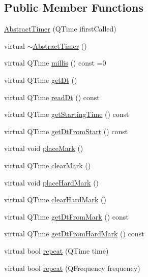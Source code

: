 \subsection*{Public Member Functions}
\begin{DoxyCompactItemize}
\item 
\mbox{\hyperlink{classokapi_1_1AbstractTimer_aec03f7e11e25f300ec1fd44aaff3596f}{Abstract\+Timer}} (Q\+Time ifirst\+Called)
\item 
virtual \mbox{\hyperlink{classokapi_1_1AbstractTimer_a720f854545bab2158135149174758736}{$\sim$\+Abstract\+Timer}} ()
\item 
virtual Q\+Time \mbox{\hyperlink{classokapi_1_1AbstractTimer_a6871e119f74d8b6a8c928244e837e762}{millis}} () const =0
\item 
virtual Q\+Time \mbox{\hyperlink{classokapi_1_1AbstractTimer_a6c79c35780dbc4e04e356167bb175424}{get\+Dt}} ()
\item 
virtual Q\+Time \mbox{\hyperlink{classokapi_1_1AbstractTimer_a4208d7ef0b828422ba02dfd563306ab1}{read\+Dt}} () const
\item 
virtual Q\+Time \mbox{\hyperlink{classokapi_1_1AbstractTimer_a4707dcc563e750ee491918d7c5755bc3}{get\+Starting\+Time}} () const
\item 
virtual Q\+Time \mbox{\hyperlink{classokapi_1_1AbstractTimer_ac681cdd9a5147df0b796e9af836502c8}{get\+Dt\+From\+Start}} () const
\item 
virtual void \mbox{\hyperlink{classokapi_1_1AbstractTimer_a34c9be79510d23d702fd22188d542ec9}{place\+Mark}} ()
\item 
virtual Q\+Time \mbox{\hyperlink{classokapi_1_1AbstractTimer_a78d62559bbd51a71372f37920af78261}{clear\+Mark}} ()
\item 
virtual void \mbox{\hyperlink{classokapi_1_1AbstractTimer_a177197191296d0d7a5c49c86d5a514fc}{place\+Hard\+Mark}} ()
\item 
virtual Q\+Time \mbox{\hyperlink{classokapi_1_1AbstractTimer_af462e941170d1659dd04ab9d1ead3968}{clear\+Hard\+Mark}} ()
\item 
virtual Q\+Time \mbox{\hyperlink{classokapi_1_1AbstractTimer_a11b84685aac3247ce5abdd11419e350e}{get\+Dt\+From\+Mark}} () const
\item 
virtual Q\+Time \mbox{\hyperlink{classokapi_1_1AbstractTimer_ae32d95df73d640f248f987757163a164}{get\+Dt\+From\+Hard\+Mark}} () const
\item 
virtual bool \mbox{\hyperlink{classokapi_1_1AbstractTimer_a452be1d251e938ab4c69801ea2d52e20}{repeat}} (Q\+Time time)
\item 
virtual bool \mbox{\hyperlink{classokapi_1_1AbstractTimer_a9153fc8d0b6daf843fa533bf601a15dd}{repeat}} (Q\+Frequency frequency)
\end{DoxyCompactItemize}
